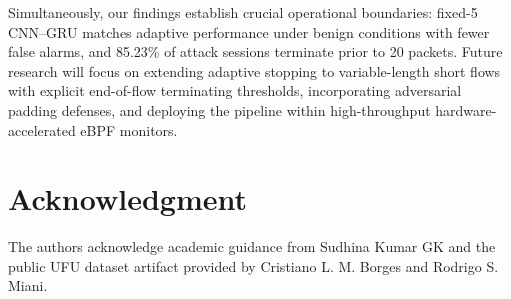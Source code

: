 \documentclass[conference]{IEEEtran}
\begin{document}
Simultaneously, our findings establish crucial operational boundaries: fixed-5 CNN--GRU matches adaptive performance under benign conditions with fewer false alarms, and 85.23\% of attack sessions terminate prior to 20 packets. Future research will focus on extending adaptive stopping to variable-length short flows with explicit end-of-flow terminating thresholds, incorporating adversarial padding defenses, and deploying the pipeline within high-throughput hardware-accelerated eBPF monitors.

\section*{Acknowledgment}
The authors acknowledge academic guidance from Sudhina Kumar GK and the public UFU dataset artifact provided by Cristiano L. M. Borges and Rodrigo S. Miani.
\end{document}

